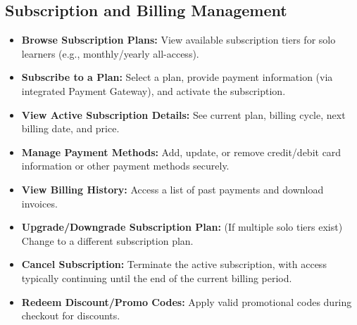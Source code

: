 \documentclass[12pt, a4paper]{report} %
\begin{document}
  \subsection{Subscription and Billing Management}
    \begin{itemize}
        \item \textbf{Browse Subscription Plans:} View available subscription tiers for solo learners (e.g., monthly/yearly all-access).
        \item \textbf{Subscribe to a Plan:} Select a plan, provide payment information (via integrated Payment Gateway), and activate the subscription.
        \item \textbf{View Active Subscription Details:} See current plan, billing cycle, next billing date, and price.
        \item \textbf{Manage Payment Methods:} Add, update, or remove credit/debit card information or other payment methods securely.
        \item \textbf{View Billing History:} Access a list of past payments and download invoices.
        \item \textbf{Upgrade/Downgrade Subscription Plan:} (If multiple solo tiers exist) Change to a different subscription plan.
        \item \textbf{Cancel Subscription:} Terminate the active subscription, with access typically continuing until the end of the current billing period.
        \item \textbf{Redeem Discount/Promo Codes:} Apply valid promotional codes during checkout for discounts.
    \end{itemize}
\end{document}
